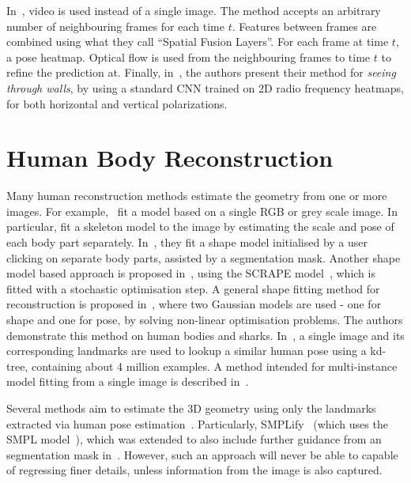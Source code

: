 In~\cite{pfister2015flowing}, video is used
instead of a single image. The method accepts an arbitrary number of
neighbouring frames for each time $t$. Features between frames are
combined using what they call ``Spatial Fusion Layers''. For each
frame at time $t$, a pose heatmap. Optical flow is used from the
neighbouring frames to time $t$ to refine the prediction at. Finally,
in~\cite{zhao2018through}, the authors present their method for
\textit{seeing through walls}, by using a standard CNN trained on 2D
radio frequency heatmaps, for both horizontal and vertical
polarizations.



\section{Human Body Reconstruction}

Many human reconstruction methods estimate the geometry from one or
more images. For
example,~\cite{balan2007detailed,grest2005human,guan2009estimating}
fit a model based on a single RGB or grey scale image. In particular,
\cite{grest2005human} fit a skeleton model to the image by estimating
the scale and pose of each body part
separately. In~\cite{guan2009estimating}, they fit a shape model
initialised by a user clicking on separate body parts, assisted by a
segmentation mask. Another shape model based approach is proposed
in~\cite{balan2007detailed}, using the SCRAPE
model~\cite{anguelov2005scape}, which is fitted with a stochastic
optimisation step. A general shape fitting method for reconstruction
is proposed in~\cite{chen2010inferring}, where two Gaussian models are
used - one for shape and one for pose, by solving non-linear
optimisation problems. The authors demonstrate this method on human
bodies and sharks. In~\cite{jiang20103d}, a single image and its
corresponding landmarks are used to lookup a similar human pose using
a kd-tree, containing about 4 million examples. A method intended for
multi-instance model fitting from a single image is described
in~\cite{Zanfir_2018_CVPR}.

Several methods aim to estimate the 3D geometry using only the
landmarks extracted via human pose
estimation~\cite{bogo2016smplify,ramakrishna2012reconstructing}. Particularly,
SMPLify~\cite{bogo2016smplify} (which uses the SMPL
model~\cite{loper2015smpl}), which was extended to also include
further guidance from an segmentation mask
in~\cite{varol2017learning}. However, such an approach will never be
able to capable of regressing finer details, unless information from
the image is also captured.

